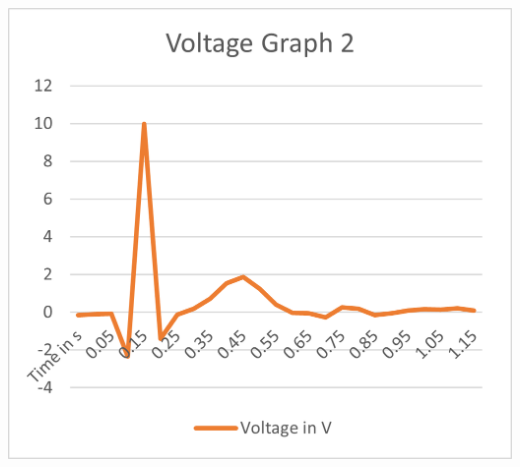 \begin{minipage}{0.5\textwidth}
    \includegraphics[width=\textwidth]{./Figure_12.png}
    \label{fig:Voltage Graph 2}
\end{minipage}

\newpage

